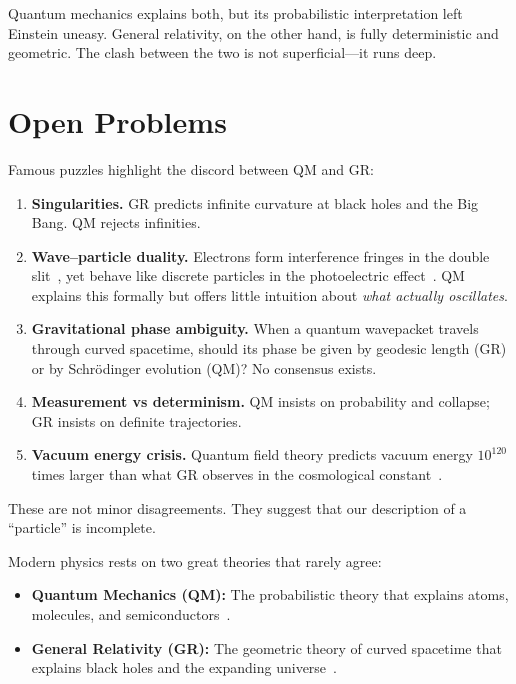 Quantum mechanics explains both, but its probabilistic interpretation left Einstein uneasy. General relativity, on the other hand, is fully deterministic and geometric. The clash between the two is not superficial—it runs deep.

\section{Open Problems}

Famous puzzles highlight the discord between QM and GR:
\begin{enumerate}
	\item \textbf{Singularities.} GR predicts infinite curvature at black holes and the Big Bang. QM rejects infinities.
	\item \textbf{Wave--particle duality.} Electrons form interference fringes in the double slit~\cite{FeynmanDoubleSlit}, yet behave like discrete particles in the photoelectric effect~\cite{EinsteinPhotoelectric}. QM explains this formally but offers little intuition about \emph{what actually oscillates}.
	\item \textbf{Gravitational phase ambiguity.} When a quantum wavepacket travels through curved spacetime, should its phase be given by geodesic length (GR) or by Schr\"odinger evolution (QM)? No consensus exists.
	\item \textbf{Measurement vs determinism.} QM insists on probability and collapse; GR insists on definite trajectories.
	\item \textbf{Vacuum energy crisis.} Quantum field theory predicts vacuum energy $10^{120}$ times larger than what GR observes in the cosmological constant~\cite{VacuumEnergyCrisis}.
\end{enumerate}

These are not minor disagreements. They suggest that our description of a ``particle'' is incomplete.

Modern physics rests on two great theories that rarely agree:

\begin{itemize}
	\item \textbf{Quantum Mechanics (QM):} The probabilistic theory that explains atoms, molecules, and semiconductors~\cite{WikipediaQM}.
	\item \textbf{General Relativity (GR):} The geometric theory of curved spacetime that explains black holes and the expanding universe~\cite{WikipediaGR}.
\end{itemize}

